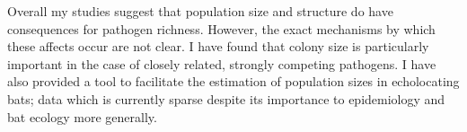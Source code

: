 

Overall my studies suggest that population size and structure do have consequences for pathogen richness. 
However, the exact mechanisms by which these affects occur are not clear.
I have found that colony size is particularly important in the case of closely related, strongly competing pathogens.
I have also provided a tool to facilitate the estimation of population sizes in echolocating bats; data which is currently sparse despite its importance to epidemiology and bat ecology more generally.



